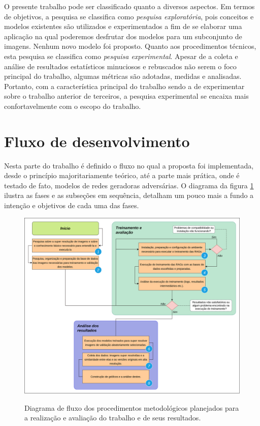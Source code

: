 \label{procedimentos}

O presente trabalho pode ser classificado quanto a diversos aspectos. Em termos de objetivos, a pesquisa se classifica como \textit{pesquisa exploratória}, pois conceitos e modelos existentes são utilizados e experimentados a fim de se elaborar uma aplicação na qual poderemos desfrutar dos modelos para um subconjunto de imagens. Nenhum novo modelo foi proposto. Quanto aos procedimentos técnicos, esta pesquisa se classifica como \textit{pesquisa experimental}. Apesar de a coleta e análise de resultados estatísticos minuciosos e rebuscados não serem o foco principal do trabalho, algumas métricas são adotadas, medidas e analisadas. Portanto, com a característica principal do trabalho sendo a de experimentar sobre o trabalho anterior de terceiros, a pesquisa experimental se encaixa mais confortavelmente com o escopo do trabalho.

\section{Fluxo de desenvolvimento}

Nesta parte do trabalho é definido o fluxo no qual a proposta foi implementada, desde o princípio majoritariamente teórico, até a parte mais prática, onde é testado de fato, modelos de redes geradoras adversárias. O diagrama da figura \ref{fig:fig9} ilustra as fases e as subseções em sequência, detalham um pouco mais a fundo a intenção e objetivos de cada uma das fases.

\begin{figure}[H]
    \centering
    \caption{Diagrama de fluxo dos procedimentos metodológicos planejados para a realização e avaliação do trabalho e de seus resultados.}
    \includegraphics[width=14cm]{fig/flow_diagram_development.png}
    \label{fig:fig9}
\end{figure}

